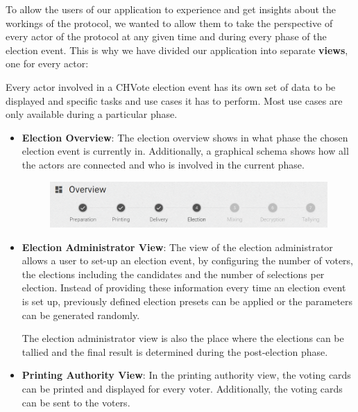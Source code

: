 To allow the users of our application to experience and get insights about the workings of the protocol, we wanted to allow them to take the perspective of every actor of the protocol at any given time and during every phase of the election event. This is why we have divided our application into separate \textbf{views}, one for every actor:

Every actor involved in a CHVote election event has its own set of data to be displayed and specific tasks and use cases it has to perform. Most use cases are only available during a particular phase.

\begin{itemize}
	\item \textbf{Election Overview}: The election overview shows in what phase the chosen election event is currently in. Additionally, a graphical schema shows how all the actors are connected and who is involved in the current phase.
\begin{figure}
\begin{center}
\includegraphics[scale=0.50]{assets/screenshots/overview.PNG}
\label{Election Overview}%
\end{center}
\end{figure}

	\item \textbf{Election Administrator View}: The view of the election administrator allows a user to set-up an election event, by configuring the number of voters, the elections including the candidates and the number of selections per election. Instead of providing these information every time an election event is set up, previously defined election presets can be applied or the parameters can be generated randomly.

The election administrator view is also the place where the elections can be tallied and the final result is determined during the post-election phase.
	\item \textbf{Printing Authority View}: In the printing authority view, the voting cards can be printed and displayed for every voter. Additionally, the voting cards can be sent to the voters.


\end{itemize}
